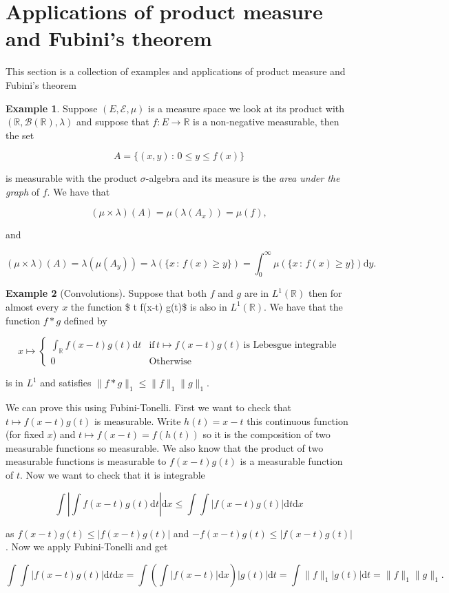 \documentclass[
]{book}
\theoremstyle{definition}
\theoremstyle{definition}
\newtheorem{example}{Example}[chapter]
\theoremstyle{definition}
\theoremstyle{definition}
\theoremstyle{remark}
\begin{document}
\hypertarget{applications-of-product-measure-and-fubinis-theorem}{%
\section{Applications of product measure and Fubini's theorem}\label{applications-of-product-measure-and-fubinis-theorem}}

This section is a collection of examples and applications of product measure and Fubini's theorem

\begin{example}
Suppose \((E, \mathcal{E}, \mu)\) is a measure space we look at its product with \((\mathbb{R}, \mathcal{B}(\mathbb{R}), \lambda)\) and suppose that \(f:E \rightarrow \mathbb{R}\) is a non-negative measurable, then the set

\[ A = \{(x,y) \,:\, 0 \leq y \leq f(x) \} \]

is measurable with the product \(\sigma\)-algebra and its measure is the \emph{area under the graph} of \(f\). We have that

\[ (\mu \times \lambda)(A) = \mu( \lambda(A_x)) = \mu(f),  \]

and

\[ (\mu \times \lambda)(A) = \lambda( \mu(A_y)) = \lambda (\{ x \,:\, f(x) \geq y \}) = \int_0^ \infty \mu(\{x \,:\, f(x) \geq y\}) \mathrm{d}y. \]
\end{example}

\begin{example}[Convolutions]
Suppose that both \(f\) and \(g\) are in \(L^1(\mathbb{R})\) then for almost every \(x\) the function \$ t \mapsto f(x-t) g(t)\$ is also in \(L^1(\mathbb{R})\). We have that the function \(f*g\) defined by

\[ x \mapsto \left\{ \begin{array}{ll} \int_\mathbb{R} f(x-t)g(t) \mathrm{d}t & \mbox{if}\, t \mapsto f(x-t)g(t)\, \mbox{is Lebesgue integrable} \\
0 & \mbox{Otherwise} \end{array}\right. \]

is in \(L^1\) and satisfies \(\|f*g\|_1 \leq \|f\|_1 \|g\|_1\).

We can prove this using Fubini-Tonelli. First we want to check that \(t \mapsto f(x-t)g(t)\) is measurable. Write \(h(t) = x-t\) this continuous function (for fixed \(x\)) and \(t \mapsto f(x-t) = f(h(t))\) so it is the composition of two measurable functions so measurable. We also know that the product of two measurable functions is measurable to \(f(x-t)g(t)\) is a measurable function of \(t\). Now we want to check that it is integrable

\[ \int \left| \int f(x-t)g(t) \mathrm{d}t \right| \mathrm{d}x \leq \int \int |f(x-t)g(t)| \mathrm{d}t \mathrm{d}x \]

as \(f(x-t)g(t) \leq |f(x-t)g(t)|\) and \(-f(x-t)g(t) \leq |f(x-t)g(t)|\). Now we apply Fubini-Tonelli and get

\[ \int \int |f(x-t)g(t)| \mathrm{d}t \mathrm{d}x = \int \left( \int |f(x-t)| \mathrm{d}x\right) |g(t)| \mathrm{d}t = \int \|f\|_1 |g(t)| \mathrm{d}t = \|f\|_1 \|g\|_1. \]
\end{example}
\end{document}
